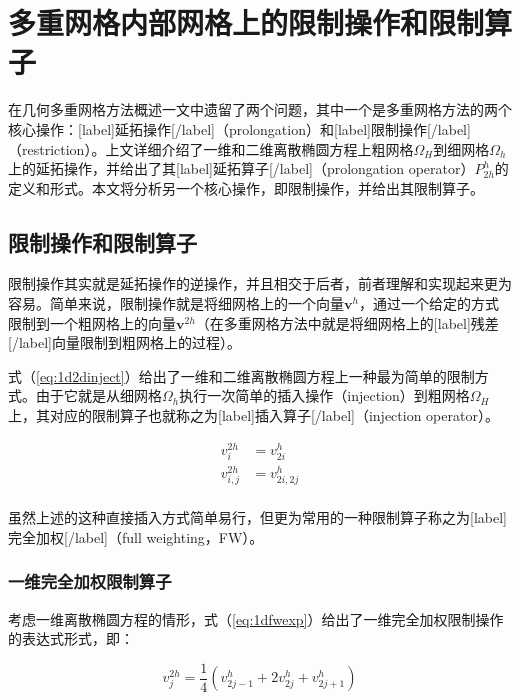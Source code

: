 \documentclass[12pt, UTF8, nofonts]{ctexart}
\begin{document}

\section*{多重网格内部网格上的限制操作和限制算子}

在几何多重网格方法概述一文中遗留了两个问题，其中一个是多重网格方法的两个核心操作：[label]延拓操作[/label]（prolongation）和[label]限制操作[/label]（restriction）。上文详细介绍了一维和二维离散椭圆方程上粗网格$\Omega_H$到细网格$\Omega_h$上的延拓操作，并给出了其[label]延拓算子[/label]（prolongation operator）$P_{2h}^{h}$的定义和形式。本文将分析另一个核心操作，即限制操作，并给出其限制算子。

\subsection*{限制操作和限制算子}

限制操作其实就是延拓操作的逆操作，并且相交于后者，前者理解和实现起来更为容易。简单来说，限制操作就是将细网格上的一个向量$\boldsymbol{v}^h$，通过一个给定的方式限制到一个粗网格上的向量$\boldsymbol{v}^{2h}$（在多重网格方法中就是将细网格上的[label]残差[/label]向量限制到粗网格上的过程）。

式（\ref{eq:1d2dinject}）给出了一维和二维离散椭圆方程上一种最为简单的限制方式。由于它就是从细网格$\Omega_h$执行一次简单的插入操作（injection）到粗网格$\Omega_H$上，其对应的限制算子也就称之为[label]插入算子[/label]（injection operator）。

\begin{equation}
  \label{eq:1d2dinject}
  \begin{aligned}
    v_{i}^{2h} &= v_{2i}^h \\
    v_{i,j}^{2h} &= v_{2i,2j}^h \\
  \end{aligned}
\end{equation}

虽然上述的这种直接插入方式简单易行，但更为常用的一种限制算子称之为[label]完全加权[/label]（full weighting，FW）。

\subsubsection*{一维完全加权限制算子}

考虑一维离散椭圆方程的情形，式（\ref{eq:1dfwexp}）给出了一维完全加权限制操作的表达式形式，即：

\begin{equation}
  \label{eq:1dfwexp}
  v_{j}^{2h} = \dfrac{1}{4}\left(v_{2j-1}^h + 2v_{2j}^h + v_{2j+1}^h\right)
\end{equation}
\end{document}
